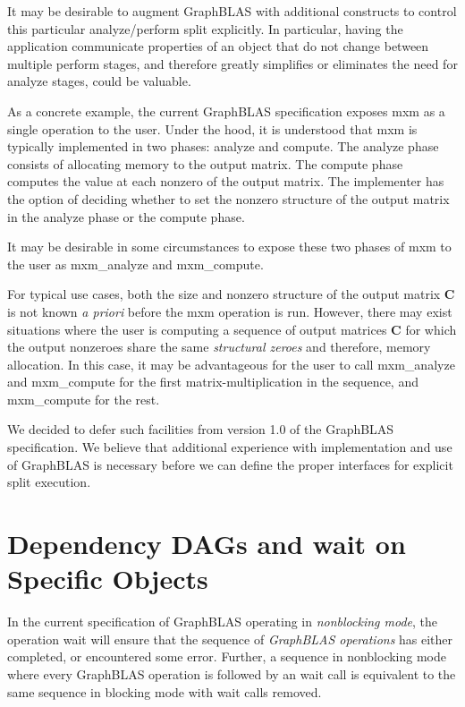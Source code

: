 It may be desirable to augment GraphBLAS with additional constructs to control this particular
analyze/perform split explicitly. In particular, having the application communicate properties of
an object that do not change between multiple perform stages, and therefore greatly simplifies
or eliminates the need for analyze stages, could be valuable.

As a concrete example, the current GraphBLAS specification exposes {\sf mxm} as a single operation to the user. Under the hood, it is understood that {\sf mxm} is typically implemented in two phases: analyze and compute. The analyze phase consists of allocating memory to the output matrix. The compute phase computes the value at each nonzero of the output matrix. The implementer has the option of deciding whether to set the nonzero structure of the output matrix in the analyze phase or the compute phase.

It may be desirable in some circumstances to expose these two phases of {\sf mxm} to the user as {\sf mxm\_analyze} and {\sf mxm\_compute}. 

For typical use cases, both the size and nonzero structure of the output matrix \textbf{C} is not known \emph{a priori} before the {\sf mxm} operation is run. However, there may exist situations where the user is computing a sequence of output matrices \textbf{C} for which the output nonzeroes share the same \emph{structural zeroes} and therefore, memory allocation. In this case, it may be advantageous for the user to call {\sf mxm\_analyze} and {\sf mxm\_compute} for the first matrix-multiplication in the sequence, and {\sf mxm\_compute} for the rest.

We decided to defer such facilities from version 1.0 of the GraphBLAS specification. We believe
that additional experience with implementation and use of GraphBLAS is necessary before
we can define the proper interfaces for explicit split execution.

\section{Dependency DAGs and {\sf wait} on Specific Objects}

In the current specification of GraphBLAS operating in \emph{nonblocking mode}, the operation {\sf wait} will ensure that the sequence of \emph{GraphBLAS operations} has either completed, or encountered some error. Further, a sequence in nonblocking mode where every GraphBLAS operation is followed by an {\sf wait} call is equivalent to the same sequence in blocking mode
with {\sf wait} calls removed.

